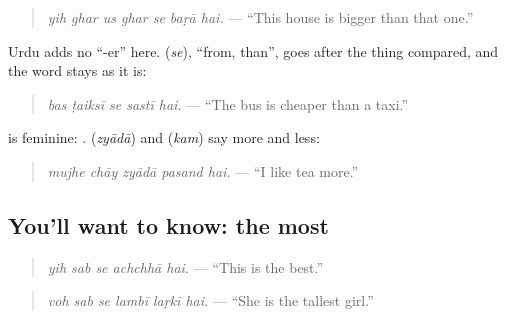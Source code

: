 \begin{quote}
\emph{yih ghar us ghar se baṛā hai.} — \textquotedblleft{}This house is bigger than that one.\textquotedblright{}
\end{quote}

Urdu adds no \textquotedblleft{}-er\textquotedblright{} here. \textbf{} (\emph{se}), \textquotedblleft{}from, than\textquotedblright{}, goes after the thing compared, and the word stays as it is:

\begin{quote}
\textbf{    }
\end{quote}

\begin{quote}
\emph{bas ṭaiksī se sastī hai.} — \textquotedblleft{}The bus is cheaper than a taxi.\textquotedblright{}
\end{quote}

\textbf{} is feminine: \textbf{}. \textbf{} (\emph{zyādā}) and \textbf{} (\emph{kam}) say more and less:

\begin{quote}
\textbf{    }
\end{quote}

\begin{quote}
\emph{mujhe chāy zyādā pasand hai.} — \textquotedblleft{}I like tea more.\textquotedblright{}
\end{quote}

\subsection*{You'll want to know: the most}
\begin{quote}
\textbf{    }
\end{quote}

\begin{quote}
\emph{yih sab se achchhā hai.} — \textquotedblleft{}This is the best.\textquotedblright{}
\end{quote}

\begin{quote}
\textbf{     }
\end{quote}

\begin{quote}
\emph{voh sab se lambī laṛkī hai.} — \textquotedblleft{}She is the tallest girl.\textquotedblright{}
\end{quote}

